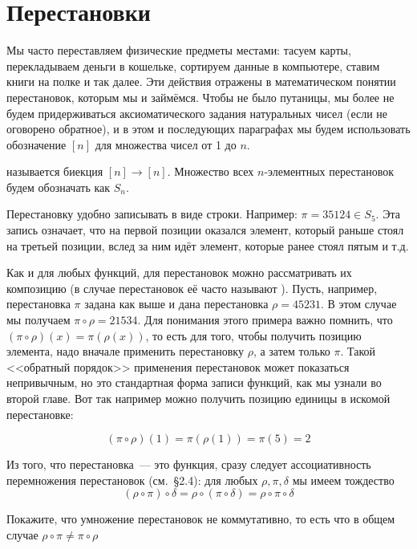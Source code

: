 \section{Перестановки}

Мы часто переставляем физические предметы местами: тасуем карты, перекладываем деньги в кошельке, сортируем данные в компьютере, ставим книги на полке и так далее. Эти действия отражены в математическом понятии перестановок, которым мы и займёмся. Чтобы не было путаницы, мы более не будем придерживаться аксиоматического задания натуральных чисел (если не оговорено обратное), и в этом и последующих параграфах мы будем использовать обозначение $[n]$ для множества чисел от 1 до $n$.

\begin{definition}
 называется биекция $[n]\to[n]$. Множество всех $n$-элементных перестановок будем обозначать как $S_n$.
\end{definition}

Перестановку удобно записывать в виде строки. Например: $\pi = 35124 \in S_5$. Эта запись означает, что на первой позиции оказался элемент, который раньше стоял на третьей позиции, вслед за ним идёт элемент, которые ранее стоял пятым и т.д.

Как и для любых функций, для перестановок можно рассматривать их композицию (в случае перестановок её часто называют ). Пусть, например, перестановка $\pi$ задана как выше и дана перестановка $\rho = 45231$. В этом случае мы получаем $\pi \circ \rho = 21534$. Для понимания этого примера важно помнить, что $(\pi\circ\rho)(x) = \pi(\rho(x))$, то есть для того, чтобы получить позицию элемента, надо вначале применить перестановку $\rho$, а затем только $\pi$. Такой <<обратный порядок>> применения перестановок может показаться непривычным, но это стандартная форма записи функций, как мы узнали во второй главе. Вот так например можно получить позицию единицы в искомой перестановке:

$$(\pi\circ\rho) (1) = \pi(\rho(1)) = \pi(5) = 2$$

Из того, что перестановка~--- это функция, сразу следует ассоциативность перемножения перестановок (см.~\S2.4): для любых $\rho, \pi, \delta$ мы имеем тождество
$$(\rho\circ\pi)\circ\delta = \rho\circ(\pi\circ\delta) = \rho\circ\pi\circ\delta$$

\begin{exercise}
Покажите, что умножение перестановок не коммутативно, то есть что в общем случае $\rho\circ\pi \not= \pi\circ\rho$
\end{exercise}

